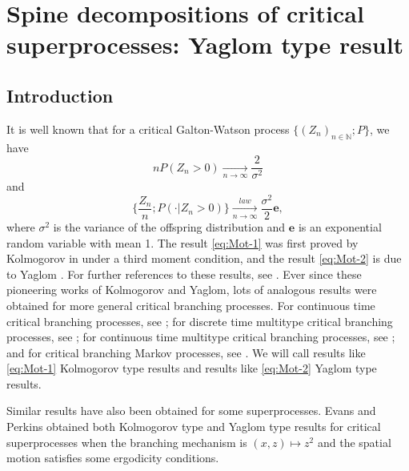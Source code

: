 
\chapter{Spine decompositions of critical superprocesses: Yaglom type result}

\section{Introduction}

	It is well known that for a critical Galton-Watson process $\{(Z_n)_{n\in \mathbb N};P\}$, we have
\begin{equation}
\label{eq:Mot-1}
	nP(Z_n>0)
	\xrightarrow[n\to\infty]{} \frac{2}{\sigma^2}
\end{equation}
	and
\begin{equation}
\label{eq:Mot-2}
	\big\{\frac{Z_n}{n}; P(\cdot|Z_n>0)\big\}
	\xrightarrow[n\to\infty]{law} \frac{\sigma^2}{2} \mathbf e,
\end{equation}
	where $\sigma^2$ is the variance of the offspring distribution and $\mathbf e$ is an exponential random variable with mean 1.
	The result \eqref{eq:Mot-1} was first proved by Kolmogorov in \cite{Kolmogorov1938Zur-losung} under a third moment condition, and the result \eqref{eq:Mot-2} is due to Yaglom \cite{Yaglom1947Certain}.
	For further references to these results, see \cite{Harris2002The-theory, KestenNeySpitzer1966The-Galton-Watson}.
	Ever since these pioneering works of Kolmogorov and Yaglom, lots of analogous results were obtained for more general critical branching processes.
	For continuous time critical branching processes, see \cite{AthreyaNey1972Branching}; for discrete time multitype critical branching processes, see \cite{AthreyaNey1972Branching, JoffeSpitzer1967On-multitype}; for continuous time multitype critical branching processes, see \cite{AthreyaNey1974Functionals}; and for critical branching Markov processes, see \cite{AsmussenHering1983Branching}.
	We will call results like \eqref{eq:Mot-1} Kolmogorov type results and results like \eqref{eq:Mot-2} Yaglom type results.
\par
	Similar results have also been obtained for some superprocesses.
	Evans and Perkins \cite{EvansPerkins1990Measure-valued} obtained both Kolmogorov type and Yaglom type results for critical superprocesses when the branching mechanism is $(x,z) \mapsto z^2$ and the spatial motion satisfies some ergodicity conditions.
